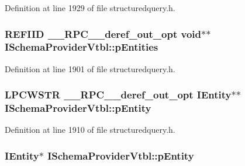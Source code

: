 Definition at line 1929 of file structuredquery.\+h.

\subsubsection[{\texorpdfstring{p\+Entities}{pEntities}}]{ {\bf R\+E\+F\+I\+ID} {\bf \+\_\+\+\_\+\+R\+P\+C\+\_\+\+\_\+deref\+\_\+out\+\_\+opt} {\bf void}$\ast$$\ast$ I\+Schema\+Provider\+Vtbl\+::p\+Entities}\hypertarget{struct_i_schema_provider_vtbl_a6879fc9423f13eec1f0e4cf29fd98b47}{}\label{struct_i_schema_provider_vtbl_a6879fc9423f13eec1f0e4cf29fd98b47}


Definition at line 1901 of file structuredquery.\+h.

\subsubsection[{\texorpdfstring{p\+Entity}{pEntity}}]{ {\bf L\+P\+C\+W\+S\+TR} {\bf \+\_\+\+\_\+\+R\+P\+C\+\_\+\+\_\+deref\+\_\+out\+\_\+opt} {\bf I\+Entity}$\ast$$\ast$ I\+Schema\+Provider\+Vtbl\+::p\+Entity}\hypertarget{struct_i_schema_provider_vtbl_aa34da01a2d553500c609d587d77309d9}{}\label{struct_i_schema_provider_vtbl_aa34da01a2d553500c609d587d77309d9}


Definition at line 1910 of file structuredquery.\+h.

\subsubsection[{\texorpdfstring{p\+Entity}{pEntity}}]{ {\bf I\+Entity}$\ast$ I\+Schema\+Provider\+Vtbl\+::p\+Entity}\hypertarget{struct_i_schema_provider_vtbl_a0f73d5496d1ceeb0dafa4e703c37f75d}{}\label{struct_i_schema_provider_vtbl_a0f73d5496d1ceeb0dafa4e703c37f75d}


